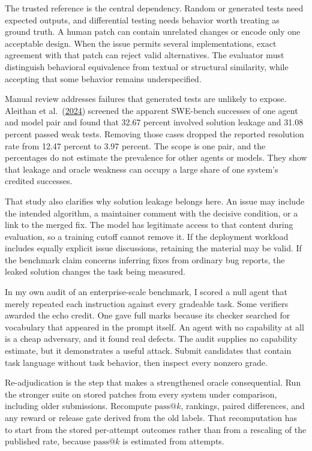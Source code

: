 The trusted reference is the central dependency. Random or generated tests need expected outputs, and differential testing needs behavior worth treating as ground truth. A human patch can contain unrelated changes or encode only one acceptable design. When the issue permits several implementations, exact agreement with that patch can reject valid alternatives. The evaluator must distinguish behavioral equivalence from textual or structural similarity, while accepting that some behavior remains underspecified.

Manual review addresses failures that generated tests are unlikely to expose. Aleithan et al.~(\href{https://arxiv.org/abs/2410.06992}{2024}) screened the apparent SWE-bench successes of one agent and model pair and found that 32.67 percent involved solution leakage and 31.08 percent passed weak tests. Removing those cases dropped the reported resolution rate from 12.47 percent to 3.97 percent. The scope is one pair, and the percentages do not estimate the prevalence for other agents or models. They show that leakage and oracle weakness can occupy a large share of one system's credited successes.

That study also clarifies why solution leakage belongs here. An issue may include the intended algorithm, a maintainer comment with the decisive condition, or a link to the merged fix. The model has legitimate access to that content during evaluation, so a training cutoff cannot remove it. If the deployment workload includes equally explicit issue discussions, retaining the material may be valid. If the benchmark claim concerns inferring fixes from ordinary bug reports, the leaked solution changes the task being measured.

In my own audit of an enterprise-scale benchmark, I scored a null agent that merely repeated each instruction against every gradeable task. Some verifiers awarded the echo credit. One gave full marks because its checker searched for vocabulary that appeared in the prompt itself. An agent with no capability at all is a cheap adversary, and it found real defects. The audit supplies no capability estimate, but it demonstrates a useful attack. Submit candidates that contain task language without task behavior, then inspect every nonzero grade.

Re-adjudication is the step that makes a strengthened oracle consequential. Run the stronger suite on stored patches from every system under comparison, including older submissions. Recompute \(\mathrm{pass}@k\), rankings, paired differences, and any reward or release gate derived from the old labels. That recomputation has to start from the stored per-attempt outcomes rather than from a rescaling of the published rate, because \(\mathrm{pass}@k\) is estimated from attempts.

